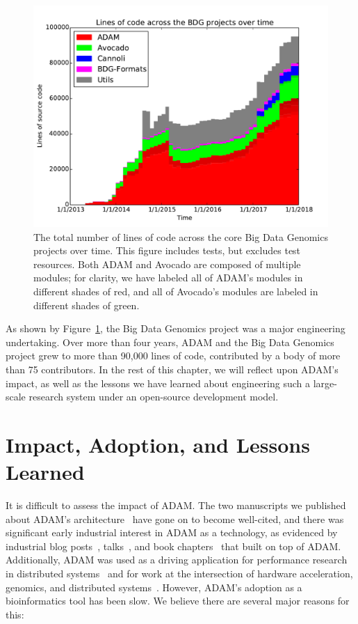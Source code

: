 \documentclass[phd]{ucbthesis}
\begin{document}
\begin{figure}[h]
  \begin{center}
    \includegraphics[width=0.95\linewidth]{graphs/source.pdf}
  \end{center}
  \caption{The total number of lines of code across the core Big Data Genomics
    projects over time. This figure includes tests, but excludes test resources.
    Both ADAM and Avocado are composed of multiple modules; for clarity, we have
    labeled all of ADAM's modules in different shades of red, and all of
    Avocado's modules are labeled in different shades of green.}
  \label{fig:source}
\end{figure}

As shown by Figure~\ref{fig:source}, the Big Data Genomics project was a major
engineering undertaking. Over more than four years, ADAM and the Big Data
Genomics project grew to more than 90,000 lines of code, contributed by a body
of more than 75 contributors. In the rest of this chapter, we will reflect upon
ADAM's impact, as well as the lessons we have learned about engineering such a
large-scale research system under an open-source development model.

\section{Impact, Adoption, and Lessons Learned}
\label{sec:impact}

It is difficult to assess the impact of ADAM. The two manuscripts we
published about ADAM's architecture~\cite{massie13, nothaft15} have gone on to
become well-cited, and there was significant early industrial interest in ADAM
as a technology, as evidenced by industrial blog posts~\cite{friedman16,
  siegel16}, talks~\cite{day15, laserson14}, and book chapters~\cite{white15,
  wills15} that built on top of ADAM. Additionally, ADAM was used as a driving
application for performance research in distributed
systems~\cite{venkataraman16ernest} and for work at the intersection of hardware
acceleration, genomics, and distributed systems~\cite{chen16}. However, ADAM's
adoption as a bioinformatics tool has been slow. We believe there are several
major reasons for this:
\end{document}
